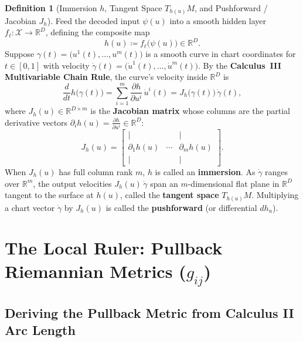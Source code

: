 \documentclass[11pt,a4paper]{article}
\newcommand{\R}{\mathbb{R}}
\theoremstyle{definition}
\newtheorem{definition}{Definition}[section]
\begin{document}
\begin{definition}[Immersion $h$, Tangent Space $T_{h(u)}M$, and Pushforward / Jacobian $J_h$]
Feed the decoded input $\psi(u)$ into a smooth hidden layer $f_\ell : \mathcal{X} \to \R^D$, defining the composite map
\[
    h(u) \coloneqq f_\ell\bigl(\psi(u)\bigr) \in \R^D.
\]
Suppose $\gamma(t) = \bigl(u^1(t), \dots, u^m(t)\bigr)$ is a smooth curve in chart coordinates for $t \in [0, 1]$ with velocity $\dot{\gamma}(t) = \bigl(\dot{u}^1(t), \dots, \dot{u}^m(t)\bigr)$. By the \textbf{Calculus~III Multivariable Chain Rule}, the curve's velocity inside $\R^D$ is
\begin{equation}
    \frac{d}{dt} h\bigl(\gamma(t)\bigr) = \sum_{i=1}^m \frac{\partial h}{\partial u^i}\,\dot{u}^i(t) = J_h\bigl(\gamma(t)\bigr)\,\dot{\gamma}(t),
    \label{eq:chain-rule}
\end{equation}
where $J_h(u) \in \R^{D \times m}$ is the \textbf{Jacobian matrix} whose columns are the partial derivative vectors $\partial_i h(u) = \frac{\partial h}{\partial u^i} \in \R^D$:
\[
    J_h(u) = \begin{bmatrix} \vert & & \vert \\ \partial_1 h(u) & \cdots & \partial_m h(u) \\ \vert & & \vert \end{bmatrix}.
\]
When $J_h(u)$ has full column rank $m$, $h$ is called an \textbf{immersion}. As $\dot{\gamma}$ ranges over $\R^m$, the output velocities $J_h(u)\,\dot{\gamma}$ span an $m$-dimensional flat plane in $\R^D$ tangent to the surface at $h(u)$, called the \textbf{tangent space} $T_{h(u)}M$. Multiplying a chart vector $\dot{\gamma}$ by $J_h(u)$ is called the \textbf{pushforward} (or differential $dh_u$).
\end{definition}

\section{The Local Ruler: Pullback Riemannian Metrics (\texorpdfstring{$g_{ij}$}{g\_ij})}
\label{sec:pullback-metrics}

\subsection{Deriving the Pullback Metric from Calculus II Arc Length}
\end{document}
